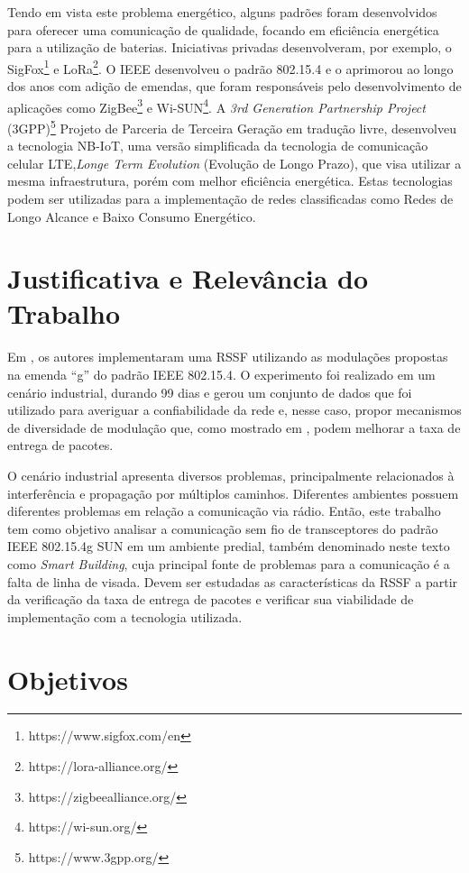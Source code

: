 Tendo em vista este problema energético, alguns padrões foram desenvolvidos para oferecer uma comunicação de qualidade, focando em eficiência energética para a utilização de baterias. Iniciativas privadas desenvolveram, por exemplo, o SigFox\footnote{https://www.sigfox.com/en} e LoRa\footnote{https://lora-alliance.org/}. O IEEE desenvolveu o padrão 802.15.4 e o aprimorou ao longo dos anos com adição de emendas, que foram responsáveis pelo desenvolvimento de aplicações como ZigBee\footnote{https://zigbeealliance.org/} e Wi-SUN\footnote{https://wi-sun.org/}. A \emph{3rd Generation Partnership Project} (3GPP)\footnote{https://www.3gpp.org/} Projeto de Parceria de Terceira Geração em tradução livre, desenvolveu a tecnologia NB-IoT, uma versão simplificada da tecnologia de comunicação celular LTE,\emph{Longe Term Evolution} (Evolução de Longo Prazo), que visa utilizar a mesma infraestrutura, porém com melhor eficiência energética. Estas tecnologias podem ser utilizadas para a implementação de redes classificadas como Redes de Longo Alcance e Baixo Consumo Energético.

\section{Justificativa e Relevância do Trabalho}
\label{sec:justificativa}
Em \cite{tuset2020dataset}, os autores implementaram uma RSSF utilizando as modulações propostas na emenda ``g'' do padrão IEEE 802.15.4. O experimento foi realizado em um cenário industrial, durando 99 dias e gerou um conjunto de dados que foi utilizado para averiguar a confiabilidade da rede e, nesse caso, propor mecanismos de diversidade de modulação que, como mostrado em \cite{gomes2020improving}, podem melhorar a taxa de entrega de pacotes.

O cenário industrial apresenta diversos problemas, principalmente relacionados à interferência e propagação por múltiplos caminhos. Diferentes ambientes possuem diferentes problemas em relação a comunicação via rádio. Então, este trabalho tem como objetivo analisar a comunicação sem fio de transceptores do padrão IEEE 802.15.4g SUN em um ambiente predial, também denominado neste texto como \emph{Smart Building}, cuja principal fonte de problemas para a comunicação é a falta de linha de visada. Devem ser estudadas as características da RSSF a partir da verificação da taxa de entrega de pacotes e verificar sua viabilidade de implementação com a tecnologia utilizada.

\section{Objetivos}
\label{sec:objetivos}

